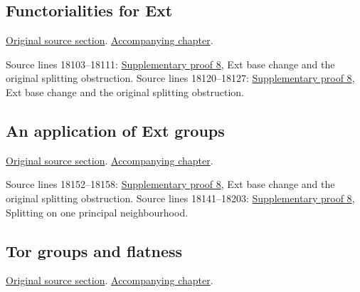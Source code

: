 \subsection{Functorialities for Ext}
\hypertarget{algebra-source-section-functoriality-ext}{}
\noindent\href{https://github.com/stacks/stacks-project/blob/a04446e57ec1fbc252a871afcec7752fb2807b14/algebra.tex\#L18087}{Original source section}. \href{algebra.pdf\#nameddest=section-functoriality-ext}{Accompanying chapter}.

\begin{AlgebraSourceRoutes}
 Source lines 18103--18111: \hyperlink{algebra_depth_tor_projective_notes_20260927}{Supplementary proof 8}, Ext base change and the original splitting obstruction.
 Source lines 18120--18127: \hyperlink{algebra_depth_tor_projective_notes_20260927}{Supplementary proof 8}, Ext base change and the original splitting obstruction.
\end{AlgebraSourceRoutes}

\subsection{An application of Ext groups}
\hypertarget{algebra-source-section-ext-application}{}
\noindent\href{https://github.com/stacks/stacks-project/blob/a04446e57ec1fbc252a871afcec7752fb2807b14/algebra.tex\#L18135}{Original source section}. \href{algebra.pdf\#nameddest=section-ext-application}{Accompanying chapter}.

\begin{AlgebraSourceRoutes}
 Source lines 18152--18158: \hyperlink{algebra_depth_tor_projective_notes_20260927}{Supplementary proof 8}, Ext base change and the original splitting obstruction.
 Source lines 18141--18203: \hyperlink{algebra_depth_tor_projective_notes_20260927}{Supplementary proof 8}, Splitting on one principal neighbourhood.
\end{AlgebraSourceRoutes}

\subsection{Tor groups and flatness}
\hypertarget{algebra-source-section-tor}{}
\noindent\href{https://github.com/stacks/stacks-project/blob/a04446e57ec1fbc252a871afcec7752fb2807b14/algebra.tex\#L18215}{Original source section}. \href{algebra.pdf\#nameddest=section-tor}{Accompanying chapter}.

